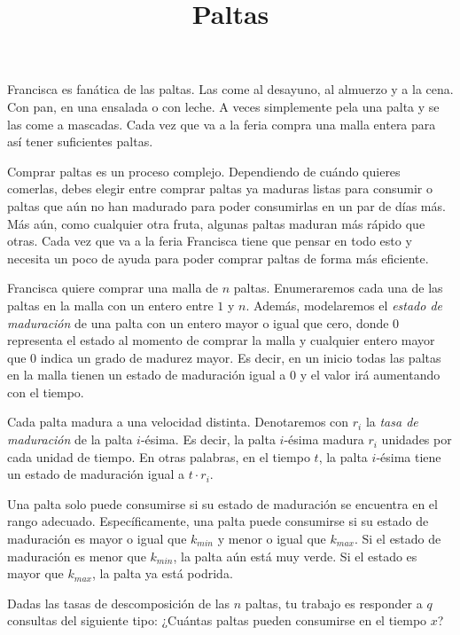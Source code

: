 \documentclass{oci}
\title{Paltas}
\begin{document}
\begin{problemDescription}
Francisca es fanática de las paltas.
Las come al desayuno, al almuerzo y a la cena.
Con pan, en una ensalada o con leche.
A veces simplemente pela una palta y se las come a mascadas.
Cada vez que va a la feria compra una malla entera para así tener suficientes paltas.

Comprar paltas es un proceso complejo.
Dependiendo de cuándo quieres comerlas, debes elegir entre comprar paltas ya maduras
listas para consumir o paltas que aún no han madurado para poder consumirlas
en un par de días más.
Más aún, como cualquier otra fruta, algunas paltas maduran más rápido que otras.
Cada vez que va a la feria Francisca tiene que pensar en todo esto y necesita un poco de ayuda
para poder comprar paltas de forma más eficiente.

Francisca quiere comprar una malla de $n$ paltas.
Enumeraremos cada una de las paltas en la malla con un entero entre $1$ y $n$.
Además, modelaremos el \emph{estado de maduración} de una palta con un entero mayor o igual que cero,
donde 0 representa el estado al momento de comprar la malla y cualquier entero mayor que 0
indica un grado de madurez mayor.
Es decir, en un inicio todas las paltas en la malla tienen un estado de maduración igual a 0 y
el valor irá aumentando con el tiempo.

Cada palta madura a una velocidad distinta.
Denotaremos con $r_i$ la \emph{tasa de maduración} de la palta $i$-ésima.
Es decir, la palta $i$-ésima madura $r_i$ unidades por cada unidad de tiempo.
En otras palabras, en el tiempo $t$, la palta $i$-ésima tiene un estado de maduración
igual a $t \cdot r_i$.

Una palta solo puede consumirse si su estado de maduración se encuentra en el rango adecuado.
Específicamente, una palta puede consumirse si su estado de maduración es mayor o igual que
$k_{min}$ y menor o igual que $k_{max}$.
Si el estado de maduración es menor que $k_{min}$, la palta aún está muy verde.
Si el estado es mayor que $k_{max}$, la palta ya está podrida.

Dadas las tasas de descomposición de las $n$ paltas, tu trabajo es responder a $q$ consultas
del siguiente tipo:
¿Cuántas paltas pueden consumirse en el tiempo $x$?
\end{problemDescription}
\end{document}
